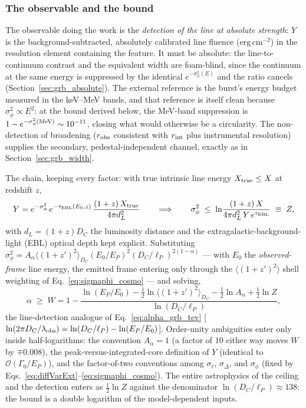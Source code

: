 \documentclass[aps,prd,onecolumn,amsmath,amssymb]{revtex4-2}
\begin{document}
\subsubsection{The observable and the bound}
\label{sec:tevline_bound}

The observable doing the work is the \emph{detection of the line at
absolute strength}: $Y$ is the background-subtracted, absolutely
calibrated line fluence ($\mathrm{erg\,cm^{-2}}$) in the resolution
element containing the feature.  It must be absolute: the
line-to-continuum contrast and the equivalent width are foam-blind,
since the continuum at the same energy is suppressed by the identical
$e^{-\sigma_\phi^2(E)}$ and the ratio cancels
(Section~\ref{sec:grb_absolute}).  The external reference is the
burst's energy budget measured in the keV--MeV bands, and that
reference is itself clean because $\sigma_\phi^2\propto E^2$: at the
bound derived below, the MeV-band suppression is
$1-e^{-\sigma_\phi^2({\rm MeV})}\sim10^{-11}$, closing what would
otherwise be a circularity.  The non-detection of broadening
($r_{\rm obs}$ consistent with $r_{\rm int}$ plus instrumental
resolution) supplies the secondary, pedestal-independent channel,
exactly as in Section~\ref{sec:grb_width}.

The chain, keeping every factor: with true intrinsic line energy
$X_{\rm true}\le X$ at redshift $z$,
\begin{equation}
  Y = e^{-\sigma_\phi^2}\,e^{-\tau_{\rm EBL}(E_0,z)}\,
      \frac{(1+z)\,X_{\rm true}}{4\pi d_L^2}
  \qquad\Longrightarrow\qquad
  \sigma_\phi^2 \;\le\;
  \ln\!\frac{(1+z)\,X}{4\pi d_L^2\,Y\,e^{\tau_{\rm EBL}}}
  \;\equiv\; Z,
  \label{eq:tevline_Z}
\end{equation}
with $d_L=(1+z)D_C$ the luminosity distance and the
extragalactic-background-light (EBL) optical depth kept explicit.
Substituting
$\sigma_\phi^2 = A_\alpha\langle(1+z')^2\rangle_{D_C}
(E_0/E_P)^2(D_C/\ell_P)^{2(1-\alpha)}$ --- with $E_0$ the
\emph{observed-frame} line energy, the emitted frame entering only
through the $\langle(1+z')^2\rangle$ shell weighting of
Eq.~\eqref{eq:sigmaphi_cosmo} --- and solving,
\begin{equation}
  \alpha \;\ge\; W
  = 1 - \frac{\ln(E_P/E_0)
        - \tfrac12\ln\langle(1+z')^2\rangle_{D_C}
        - \tfrac12\ln A_\alpha
        + \tfrac12\ln Z}
       {\ln(D_C/\ell_P)},
  \label{eq:tevline_W}
\end{equation}
the line-detection analogue of Eq.~\eqref{eq:alpha_grb_tev}
[$\ln(2\pi D_C/\lambda_{\rm obs}) = \ln(D_C/\ell_P)-\ln(E_P/E_0)$].
Order-unity ambiguities enter only inside half-logarithms: the
convention $A_\alpha=1$ (a factor of $10$ either way moves $W$ by
$\mp0.008$), the peak-versus-integrated-core definition of $Y$
(identical to $\mathcal{O}(\Gamma_0/E_P)$), and the factor-of-two
conventions among $\sigma_\ell$, $\sigma_\Delta$, and $\sigma_\phi$
(fixed by Eqs.~\eqref{eq:diffVarExt}--\eqref{eq:sigmaphi_cosmo}).
The entire astrophysics of the ceiling and the detection enters as
$\tfrac12\ln Z$ against the denominator
$\ln(D_C/\ell_P)\approx138$: the bound is a double logarithm of the
model-dependent inputs.
\end{document}
